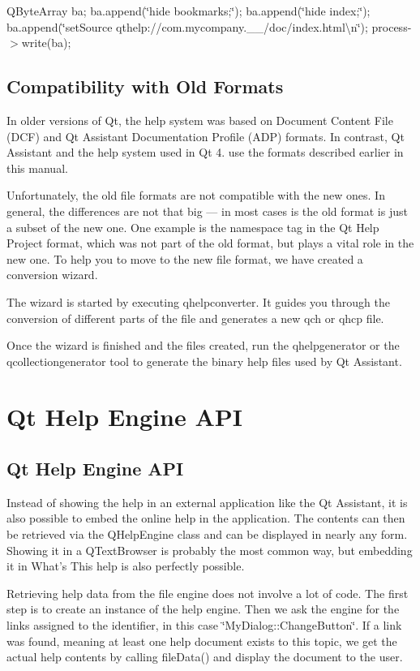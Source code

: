 Q\-Byte\-Array ba; ba.\-append(\char`\"{}hide bookmarks;\char`\"{}); ba.\-append(\char`\"{}hide index;\char`\"{}); ba.\-append(\char`\"{}set\-Source qthelp\-://com.\-mycompany.\-\_\-\_/doc/index.\-html\textbackslash{}n\char`\"{}); process-\/$>$write(ba);\hypertarget{assistant_assitant_compat}{}\subsection{Compatibility with Old Formats}\label{assistant_assitant_compat}
In older versions of Qt, the help system was based on Document Content File (D\-C\-F) and Qt Assistant Documentation Profile (A\-D\-P) formats. In contrast, Qt Assistant and the help system used in Qt 4. use the formats described earlier in this manual.

Unfortunately, the old file formats are not compatible with the new ones. In general, the differences are not that big — in most cases is the old format is just a subset of the new one. One example is the namespace tag in the Qt Help Project format, which was not part of the old format, but plays a vital role in the new one. To help you to move to the new file format, we have created a conversion wizard.

The wizard is started by executing qhelpconverter. It guides you through the conversion of different parts of the file and generates a new qch or qhcp file.

Once the wizard is finished and the files created, run the qhelpgenerator or the qcollectiongenerator tool to generate the binary help files used by Qt Assistant. \hypertarget{helpengine_api}{}\section{Qt Help Engine A\-P\-I}\label{helpengine_api}
\hypertarget{helpengine_api_helpengine_api}{}\subsection{Qt Help Engine A\-P\-I}\label{helpengine_api_helpengine_api}
Instead of showing the help in an external application like the Qt Assistant, it is also possible to embed the online help in the application. The contents can then be retrieved via the Q\-Help\-Engine class and can be displayed in nearly any form. Showing it in a Q\-Text\-Browser is probably the most common way, but embedding it in What's This help is also perfectly possible.

Retrieving help data from the file engine does not involve a lot of code. The first step is to create an instance of the help engine. Then we ask the engine for the links assigned to the identifier, in this case \char`\"{}\-My\-Dialog\-::\-Change\-Button\char`\"{}. If a link was found, meaning at least one help document exists to this topic, we get the actual help contents by calling file\-Data() and display the document to the user.

